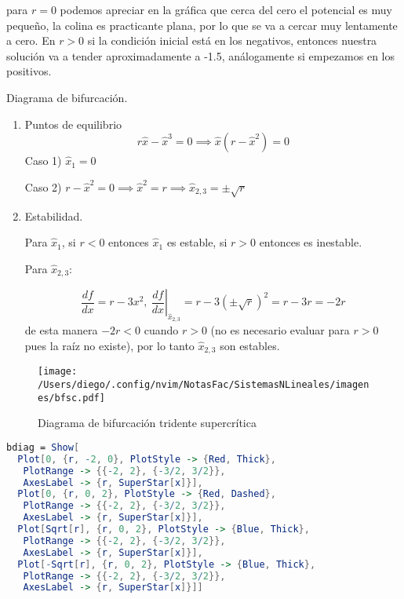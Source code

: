 \documentclass[12pt,letterpaper]{article}
\begin{document}
\begin{enumerate}
    para $r=0$ podemos apreciar en la gráfica que cerca del cero el potencial es muy pequeño, la colina es practicante plana, por lo que se va a cercar muy lentamente a cero. En $r>0$ si la condición inicial está en los negativos, entonces nuestra solución va a tender aproximadamente a -1.5, análogamente si empezamos en los positivos.

    Diagrama de bifurcación.

    \begin{enumerate}
      \item Puntos de equilibrio
	$$
	r\hat{x}-\hat{x}^3=0 \implies \hat{x}(r-\hat{x}^2)=0
	$$
	Caso 1) $\hat{x}_1=0$

	Caso 2) $r-\hat{x}^2=0 \implies \hat{x}^2=r \implies \hat{x}_{2,3}= \pm \sqrt{r}$

      \item Estabilidad.

	Para $\hat{x}_1$, si $r<0$ entonces $\hat{x}_1$ es estable, si $r>0$ entonces es inestable. 

	Para $\hat{x}_{2,3}$:

	$$
	\frac{df}{dx}=r-3x^2, \ \left. \frac{df}{dx} \right|_{\hat{x}_{2,3}} = r-3(\pm \sqrt{r})^2 = r-3r=-2r
	$$
	de esta manera $-2r<0$ cuando $r>0$ (no es necesario evaluar para $r>0$ pues la raíz no existe), por lo tanto $\hat{x}_{2,3}$ son estables.
    \end{enumerate}

    \begin{figure}[htpb]
      \centering
      \texttt{[image: /Users/diego/.config/nvim/NotasFac/SistemasNLineales/imagenes/bfsc.pdf]}
      \caption{Diagrama de bifurcación tridente supercrítica}
    \end{figure}

    \begin{tcolorbox}[colback=Orange!10, colframe=Orange,title=Código figura 5]
    \begin{lstlisting}[language=Mathematica]
    bdiag = Show[
  Plot[0, {r, -2, 0}, PlotStyle -> {Red, Thick}, 
   PlotRange -> {{-2, 2}, {-3/2, 3/2}}, 
   AxesLabel -> {r, SuperStar[x]}], 
  Plot[0, {r, 0, 2}, PlotStyle -> {Red, Dashed}, 
   PlotRange -> {{-2, 2}, {-3/2, 3/2}}, 
   AxesLabel -> {r, SuperStar[x]}], 
  Plot[Sqrt[r], {r, 0, 2}, PlotStyle -> {Blue, Thick}, 
   PlotRange -> {{-2, 2}, {-3/2, 3/2}}, 
   AxesLabel -> {r, SuperStar[x]}], 
  Plot[-Sqrt[r], {r, 0, 2}, PlotStyle -> {Blue, Thick}, 
   PlotRange -> {{-2, 2}, {-3/2, 3/2}}, 
   AxesLabel -> {r, SuperStar[x]}]]
    \end{lstlisting}  
    \end{tcolorbox}


\end{enumerate}
\end{document}
